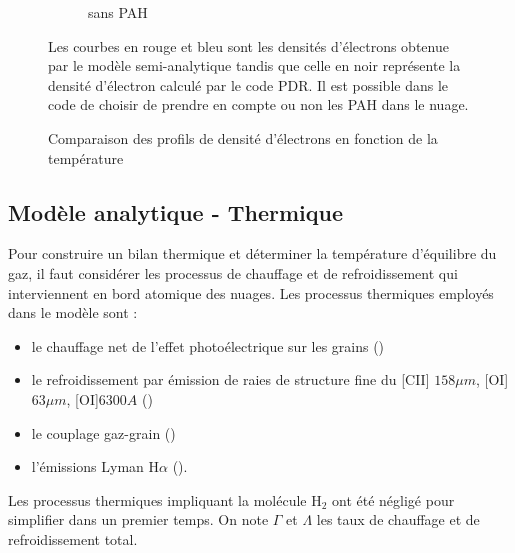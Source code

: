 \begin{figure}[!h]
\begin{subfigure}[t]{0.49\textwidth}
        \caption{sans PAH}
        \label{fig:Cl:model:recnoPAH}
    \end{subfigure}
    \caption{Comparaison des profils de densité d'électrons en fonction de la température}
    \begin{minipage}{\textwidth}
    Les courbes en rouge et bleu sont les densités d'électrons obtenue par le modèle semi-analytique tandis que celle en noir représente la densité d'électron calculé par le code PDR. Il est possible dans le code de choisir de prendre en compte ou non les PAH dans le nuage. 
    \end{minipage}
    \label{fig:Cl:model:rec}
\end{figure}




\subsection{Modèle analytique - Thermique}

Pour construire un bilan thermique et déterminer la température d'équilibre du gaz, il faut considérer les processus de chauffage et de refroidissement qui interviennent en bord atomique des nuages. Les processus thermiques employés dans le modèle sont :

\begin{itemize}
    \item le chauffage net de l'effet photoélectrique sur les grains (\cite{BakesTielens1994})
    \item le refroidissement par émission de raies de structure fine du [CII] $158 \mu m$,  [OI]$63 \mu m$, [OI]$6300A$ (\cite{Rollig2005})
    \item le couplage gaz-grain (\cite{Hollenbach1991})
    \item l'émissions Lyman $\mathrm{H}\alpha$ (\cite{tielens2005}).
\end{itemize}{}

Les processus thermiques impliquant la molécule $\mathrm{H}_2$ ont été négligé pour simplifier dans un premier temps.
On note $\Gamma$ et $\Lambda$ les taux de chauffage et de refroidissement total.

